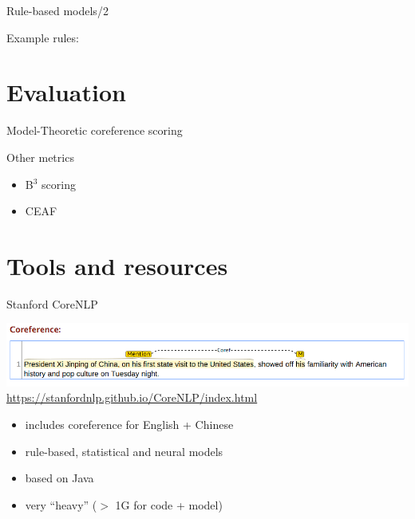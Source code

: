\documentclass[dvipsnames, 10pt, compress]{beamer}
\begin{document}
\begin{frame}{Rule-based models/2} %

Example rules:



\end{frame}


\section{Evaluation}


\begin{frame}{Model-Theoretic coreference scoring}


\end{frame}

\begin{frame}{Other metrics}

\begin{itemize}
   \item B$^3$ scoring
    \item CEAF
\end{itemize}

\end{frame}

\section{Tools and resources}

\begin{frame}{Stanford CoreNLP}

\begin{center}
\includegraphics[width=\textwidth]{graphics/Xi-Jinping.png} \\
\url{https://stanfordnlp.github.io/CoreNLP/index.html}
\end{center}

\begin{itemize}
 \item includes coreference for English + Chinese
 \item rule-based, statistical and neural models
 \item based on Java
 \item very ``heavy'' ($>$ 1G for code + model)
\end{itemize}

\end{frame}
\end{document}

